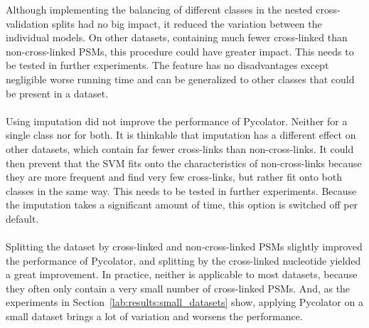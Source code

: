 Although implementing the balancing of different classes in the nested cross-validation splits had no big impact, it reduced the variation between the individual models. On other datasets, containing much fewer cross-linked than non-cross-linked PSMs, this procedure could have greater impact. This needs to be tested in further experiments. The feature has no disadvantages except negligible worse running time and can be generalized to other classes that could be present in a dataset.\\\\
Using imputation did not improve the performance of Pycolator. Neither for a single class nor for both. It is thinkable that imputation has a different effect on other datasets, which contain far fewer cross-links than non-cross-links. It could then prevent that the SVM fits onto the characteristics of non-cross-links because they are more frequent and find very few cross-links, but rather fit onto both classes in the same way. This needs to be tested in further experiments. Because the imputation takes a significant amount of time, this option is switched off per default.\\\\
Splitting the dataset by cross-linked and non-cross-linked PSMs slightly improved the performance of Pycolator, and splitting by the cross-linked nucleotide yielded a great improvement. In practice, neither is applicable to most datasets, because they often only contain a very small number of cross-linked PSMs. And, as the experiments in Section~\ref{lab:results:small_datasets} show, applying Pycolator on a small dataset brings a lot of variation and worsens the performance.\\
